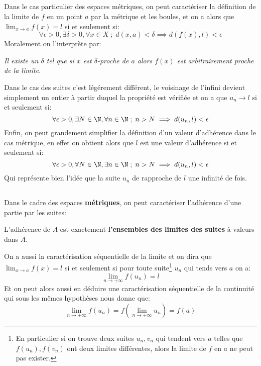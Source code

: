 \subsection*{}
Dans le cas particulier des espaces métriques, on peut caractériser la définition de la limite de \(f\) en un point \(a\) par la métrique et les boules, et on a alors que \(\lim_{x \rightarrow a} f(x) = l\) si et seulement si:
\[
   \forall \epsilon > 0 , \exists \delta > 0 , \forall x \in X \; ; \; d(x, a) < \delta \implies d(f(x), l) < \epsilon
\]
Moralement on l'interprète par:
\begin{center}
   \textit{Il existe un \(\delta\) tel que si \(x\) est \(\delta\)-proche de \(a\) alors \(f(x)\) est arbitrairement proche de la limite.}
\end{center}
Dans le cas des suites c'est légérement différent, le voisinage de l'infini devient simplement un entier à partir duquel la propriété est vérifiée et on a que \(u_n \longrightarrow l\) si et seulement si:
\[
   \forall \epsilon > 0 , \exists N \in \N , \forall n \in \N \; ; \; n > N  \implies d(u_n, l) < \epsilon
\]
Enfin, on peut grandement simplifier la définition d'un valeur d'adhérence dans le cas métrique, en effet on obtient alors que \(l\) est une valeur d'adhérence si et seulement si:
\[
   \forall \epsilon > 0 , \forall N \in \N , \exists n \in \N \; ; \; n > N \implies d(u_n, l) < \epsilon
\]
Qui représente bien l'idée que la suite \(u_n\) de rapproche de \(l\) une infinité de fois.
\subsection*{}
Dans le cadre des espaces \textbf{métriques}, on peut caractériser l'adhérence d'une partie par les suites:
\begin{center}
   L'adhérence de \(A\) est exactement \textbf{l'ensembles des limites des suites} à valeurs dans \(A\).
\end{center}
On a aussi la caractérisation séquentielle de la limite et on dira que \(\lim_{x \rightarrow a} f(x) = l\) si et seulement si pour toute suite\footnote[1]{En particulier si on trouve deux suites \(u_n, v_n\) qui tendent vers \(a\) telles que \(f(u_n), f(v_n)\) ont deux limites différentes, alors la limite de \(f\) en \(a\) ne peut pas exister.} \(u_n\) qui tends vers \(a\) on a:
\[
   \lim_{n \rightarrow +\infty} f(u_n) = l
\]
Et on peut alors aussi en déduire une caractérisation séquentielle de la continuité qui sous les mêmes hypothèses nous donne que:
\[
   \lim_{n \rightarrow +\infty} f(u_n) = f(\lim_{n \rightarrow +\infty}u_n) = f(a)
\]
\pagebreak

